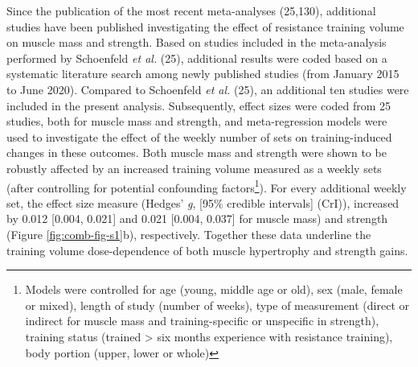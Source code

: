 \documentclass[twoside,10pt]{gihclass} %
\begin{document}
Since the publication of the most recent meta-analyses (25,130),
additional studies have been published investigating the effect of resistance training volume on muscle mass and strength. Based on studies included in the meta-analysis performed by Schoenfeld \emph{et al.} (25), additional results were coded based on a systematic literature search among newly published studies (from January 2015 to June 2020). Compared to Schoenfeld \emph{et al.} (25), an additional ten studies were included in the present analysis.
Subsequently, effect sizes were coded from 25 studies, both for muscle mass and strength, and meta-regression models were used to investigate the effect of the weekly number of sets on training-induced changes in these outcomes.
Both muscle mass and strength were shown to be robustly affected by an increased training volume measured as a weekly sets (after controlling for potential confounding factors\footnote{Models were controlled for age (young, middle age or old), sex (male, female or mixed), length of study (number of weeks), type of measurement (direct or indirect for muscle mass and training-specific or unspecific in strength), training status (trained \textgreater{} six months experience with resistance training), body portion (upper, lower or whole)}).
For every additional weekly set, the effect size measure (Hedges' \emph{g}, {[}95\% credible intervals{]} (CrI)), increased by
0.012 {[}0.004, 0.021{]} and 0.021 {[}0.004, 0.037{]}
for muscle mass)
and strength (Figure \ref{fig:comb-fig-s1}b),
respectively.
Together these data underline the training volume dose-dependence of both muscle hypertrophy and strength gains.
\end{document}
